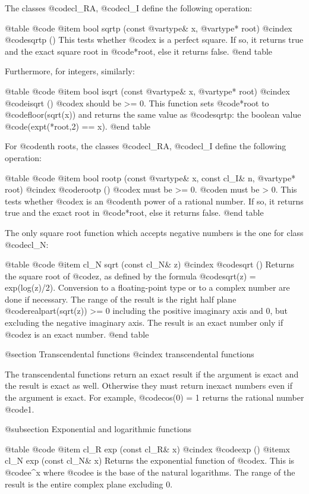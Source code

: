 The classes @code{cl_RA}, @code{cl_I} define the following operation:

@table @code
@item bool sqrtp (const @var{type}& x, @var{type}* root)
@cindex @code{sqrtp ()}
This tests whether @code{x} is a perfect square. If so, it returns true
and the exact square root in @code{*root}, else it returns false.
@end table

Furthermore, for integers, similarly:

@table @code
@item bool isqrt (const @var{type}& x, @var{type}* root)
@cindex @code{isqrt ()}
@code{x} should be >= 0. This function sets @code{*root} to
@code{floor(sqrt(x))} and returns the same value as @code{sqrtp}:
the boolean value @code{(expt(*root,2) == x)}.
@end table

For @code{n}th roots, the classes @code{cl_RA}, @code{cl_I}
define the following operation:

@table @code
@item bool rootp (const @var{type}& x, const cl_I& n, @var{type}* root)
@cindex @code{rootp ()}
@code{x} must be >= 0. @code{n} must be > 0.
This tests whether @code{x} is an @code{n}th power of a rational number.
If so, it returns true and the exact root in @code{*root}, else it returns
false.
@end table

The only square root function which accepts negative numbers is the one
for class @code{cl_N}:

@table @code
@item cl_N sqrt (const cl_N& z)
@cindex @code{sqrt ()}
Returns the square root of @code{z}, as defined by the formula
@code{sqrt(z) = exp(log(z)/2)}. Conversion to a floating-point type
or to a complex number are done if necessary. The range of the result is the
right half plane @code{realpart(sqrt(z)) >= 0}
including the positive imaginary axis and 0, but excluding
the negative imaginary axis.
The result is an exact number only if @code{z} is an exact number.
@end table


@section Transcendental functions
@cindex transcendental functions

The transcendental functions return an exact result if the argument
is exact and the result is exact as well. Otherwise they must return
inexact numbers even if the argument is exact.
For example, @code{cos(0) = 1} returns the rational number @code{1}.


@subsection Exponential and logarithmic functions

@table @code
@item cl_R exp (const cl_R& x)
@cindex @code{exp ()}
@itemx cl_N exp (const cl_N& x)
Returns the exponential function of @code{x}. This is @code{e^x} where
@code{e} is the base of the natural logarithms. The range of the result
is the entire complex plane excluding 0.

